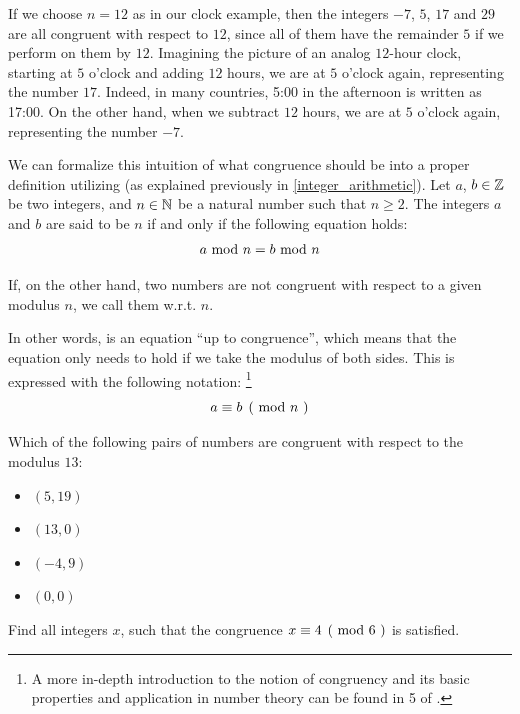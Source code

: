 \begin{example}
If we choose $n=12$ as in our clock example, then the integers $-7$, $5$, $17$ and $29$ are all congruent with respect to $12$, since all of them have the remainder $5$ if we perform  on them by $12$. Imagining the picture of an analog $12$-hour clock, starting at $5$ o'clock and adding  $12$ hours, we are at $5$ o'clock again, representing the number $17$. Indeed, in many countries, 5:00 in the afternoon is written as 17:00. On the other hand, when we subtract $12$ hours, we are at $5$ o'clock again, representing the number $-7$.
\end{example}
We can formalize this intuition of what congruence should be into a proper definition utilizing  (as explained previously in \ref{integer_arithmetic}). Let $ a $, $ b \in \mathbb{Z} $ be two integers, and $ n \in \mathbb{N} $ be a natural number such that $n\geq 2$. The integers $ a $ and $ b $ are said to be  $ n $ if and only if the following equation holds:
\begin{equation}
a \text{ mod } n = b \text{ mod } n
\end{equation}

If, on the other hand, two numbers are not congruent with respect to a given modulus $n$, we call them  w.r.t. $n$.

In other words,  is an equation ``up to congruence'', which means that the equation only needs to hold if we take the modulus of both sides. This is expressed with the following notation:
\footnote{A more in-depth introduction to the notion of congruency and its basic properties and
application in number theory can be found in \chaptname{} 5 of \cite{hardy-2008}.}
\begin{equation}
\kongru{a}{b}{n}
\end{equation}
\begin{exercise}
Which of the following pairs of numbers are congruent with respect to the modulus $13$:
\begin{itemize}\compactlist
\item $(5,19)$
\item $(13,0)$
\item $(-4,9)$
\item $(0,0)$
\end{itemize}
\end{exercise}
\begin{exercise}
Find all integers $x$, such that the congruence $\kongru{x}{4}{6}$ is satisfied.
\end{exercise}
